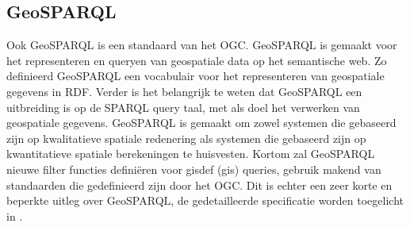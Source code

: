 \subsection{GeoSPARQL}
Ook GeoSPARQL is een standaard van het OGC. GeoSPARQL is gemaakt voor het representeren en queryen van geospatiale data op het semantische web. Zo definieerd GeoSPARQL een vocabulair voor het representeren van geospatiale gegevens in RDF. Verder is het belangrijk te weten dat GeoSPARQL een uitbreiding is op de SPARQL query taal, met als doel het verwerken van geospatiale gegevens. GeoSPARQL is gemaakt om zowel systemen die gebaseerd zijn op kwalitatieve spatiale redenering als systemen die gebaseerd zijn op kwantitatieve spatiale berekeningen te huisvesten. Kortom zal GeoSPARQL nieuwe filter functies definiëren voor \gls{gisdef} (\acrshort{gis}) queries, gebruik makend van standaarden die gedefinieerd zijn door het OGC. Dit is echter een zeer korte en beperkte uitleg over GeoSPARQL, de gedetailleerde specificatie worden toegelicht in .